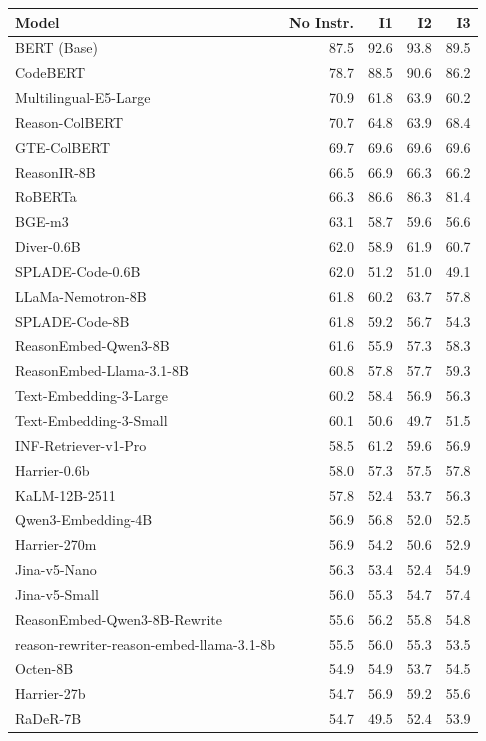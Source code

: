 \begin{tabular}{lrrrr}
\toprule
Model & No Instr. & I1 & I2 & I3 \\
\midrule
BERT (Base) & 87.5 & 92.6 & 93.8 & 89.5 \\
CodeBERT & 78.7 & 88.5 & 90.6 & 86.2 \\
Multilingual-E5-Large & 70.9 & 61.8 & 63.9 & 60.2 \\
Reason-ColBERT & 70.7 & 64.8 & 63.9 & 68.4 \\
GTE-ColBERT & 69.7 & 69.6 & 69.6 & 69.6 \\
ReasonIR-8B & 66.5 & 66.9 & 66.3 & 66.2 \\
RoBERTa & 66.3 & 86.6 & 86.3 & 81.4 \\
BGE-m3 & 63.1 & 58.7 & 59.6 & 56.6 \\
Diver-0.6B & 62.0 & 58.9 & 61.9 & 60.7 \\
SPLADE-Code-0.6B & 62.0 & 51.2 & 51.0 & 49.1 \\
LLaMa-Nemotron-8B & 61.8 & 60.2 & 63.7 & 57.8 \\
SPLADE-Code-8B & 61.8 & 59.2 & 56.7 & 54.3 \\
ReasonEmbed-Qwen3-8B & 61.6 & 55.9 & 57.3 & 58.3 \\
ReasonEmbed-Llama-3.1-8B & 60.8 & 57.8 & 57.7 & 59.3 \\
Text-Embedding-3-Large & 60.2 & 58.4 & 56.9 & 56.3 \\
Text-Embedding-3-Small & 60.1 & 50.6 & 49.7 & 51.5 \\
INF-Retriever-v1-Pro & 58.5 & 61.2 & 59.6 & 56.9 \\
Harrier-0.6b & 58.0 & 57.3 & 57.5 & 57.8 \\
KaLM-12B-2511 & 57.8 & 52.4 & 53.7 & 56.3 \\
Qwen3-Embedding-4B & 56.9 & 56.8 & 52.0 & 52.5 \\
Harrier-270m & 56.9 & 54.2 & 50.6 & 52.9 \\
Jina-v5-Nano & 56.3 & 53.4 & 52.4 & 54.9 \\
Jina-v5-Small & 56.0 & 55.3 & 54.7 & 57.4 \\
ReasonEmbed-Qwen3-8B-Rewrite & 55.6 & 56.2 & 55.8 & 54.8 \\
reason-rewriter-reason-embed-llama-3.1-8b & 55.5 & 56.0 & 55.3 & 53.5 \\
Octen-8B & 54.9 & 54.9 & 53.7 & 54.5 \\
Harrier-27b & 54.7 & 56.9 & 59.2 & 55.6 \\
RaDeR-7B & 54.7 & 49.5 & 52.4 & 53.9 \\

\end{tabular}
